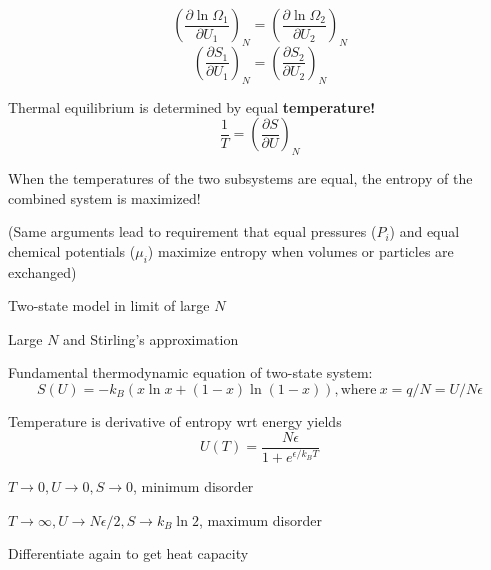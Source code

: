 \message{ !name(Outline.tex)}\documentclass[11pt]{article}
\begin{document}
\begin{outline}
\begin{outline}
\begin{outline}
        \begin{displaymath}
 \left ( \frac{\partial \ln \Omega_1}{\partial U_1} \right )_N = \left ( \frac{\partial \ln \Omega_2}{\partial U_2} \right )_N
        \end{displaymath}
        \begin{displaymath}
 \left ( \frac{\partial S_1}{\partial U_1} \right )_N = \left ( \frac{\partial S_2}{\partial U_2} \right )_N
        \end{displaymath}
      \item Thermal equilibrium is determined by equal {\bf temperature!}
        \begin{displaymath}
            \frac{1}{T}=\left ( \frac{\partial S}{\partial U} \right )_N
          \end{displaymath}
        \item When the temperatures of the two subsystems are equal, the
          entropy of the combined system is maximized!
        \item (Same arguments lead to requirement that equal pressures ($P_i$) and
          equal chemical potentials ($\mu_i$) maximize entropy when volumes or
          particles are exchanged)
        \end{outline}

      \item Two-state model in limit of large $N$
        \begin{outline}
        \item Large $N$ and Stirling's approximation
        \item Fundamental thermodynamic equation of two-state system:
        \begin{displaymath}
          S(U)=-k_B \left ( x \ln x + (1-x) \ln (1-x) \right ), \mathrm{where}\
          x = q/N = U/N\epsilon
        \end{displaymath}
      \item Temperature is derivative of entropy wrt energy yields          
          \begin{displaymath}
            U(T) = \frac{N\epsilon}{1+e^{\epsilon/k_BT}}
          \end{displaymath}
        \begin{outline}
          \item $T \rightarrow 0, U \rightarrow 0, S \rightarrow 0$, minimum disorder
          \item $T \rightarrow \infty, U \rightarrow N\epsilon/2, S \rightarrow
            k_B \ln 2$, maximum disorder
        \end{outline}
      \item Differentiate again to get heat capacity
      \end{outline}


\end{outline}
\end{outline}
\end{document}
